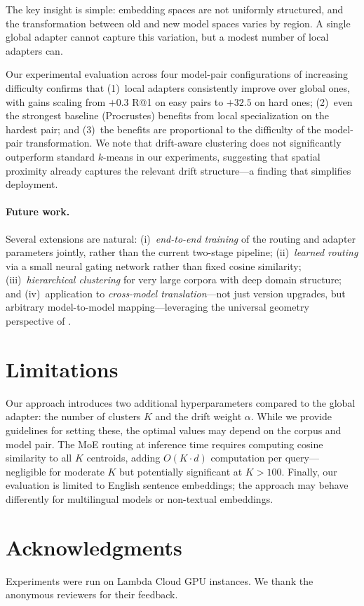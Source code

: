 \documentclass[11pt,a4paper]{article}
\begin{document}
The key insight is simple: embedding spaces are not uniformly structured, and the transformation between old and new model spaces varies by region.
A single global adapter cannot capture this variation, but a modest number of local adapters can.

Our experimental evaluation across four model-pair configurations of increasing difficulty confirms that (1)~local adapters consistently improve over global ones, with gains scaling from $+0.3$ R@1 on easy pairs to $+32.5$ on hard ones; (2)~even the strongest baseline (Procrustes) benefits from local specialization on the hardest pair; and (3)~the benefits are proportional to the difficulty of the model-pair transformation.
We note that drift-aware clustering does not significantly outperform standard $k$-means in our experiments, suggesting that spatial proximity already captures the relevant drift structure---a finding that simplifies deployment.

\paragraph{Future work.}
Several extensions are natural:
(i)~\emph{end-to-end training} of the routing and adapter parameters jointly, rather than the current two-stage pipeline;
(ii)~\emph{learned routing} via a small neural gating network \citep{shazeer2017moe} rather than fixed cosine similarity;
(iii)~\emph{hierarchical clustering} for very large corpora with deep domain structure;
and (iv)~application to \emph{cross-model translation}---not just version upgrades, but arbitrary model-to-model mapping---leveraging the universal geometry perspective of \citet{huh2024platonic,jha2025universal}.

\section*{Limitations}

Our approach introduces two additional hyperparameters compared to the global adapter: the number of clusters $K$ and the drift weight $\alpha$.
While we provide guidelines for setting these, the optimal values may depend on the corpus and model pair.
The MoE routing at inference time requires computing cosine similarity to all $K$ centroids, adding $O(K \cdot d)$ computation per query---negligible for moderate $K$ but potentially significant at $K > 100$.
Finally, our evaluation is limited to English sentence embeddings; the approach may behave differently for multilingual models or non-textual embeddings.

\section*{Acknowledgments}

Experiments were run on Lambda Cloud GPU instances. We thank the anonymous reviewers for their feedback.


\end{document}

